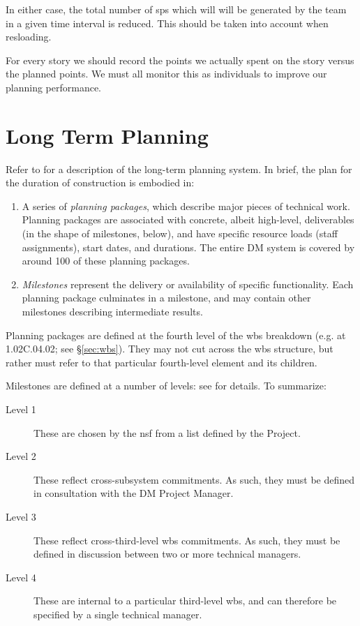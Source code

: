 In either case, the total number of \glspl{sp} which will will be generated by the team in a given time interval is reduced.
This should be taken into account when \gls{resloading}.

For every \gls{story} we should record the points we actually spent on the \gls{story} versus the planned points.
We must all monitor this as individuals to improve our planning performance.

\section{Long Term Planning}
\label{sec:long-term-plan}

Refer to  for a description of the long-term planning system.
In brief, the plan for the duration of construction is embodied in:

\begin{enumerate}
\item
  A series of \emph{planning packages}, which describe major pieces of
  technical work. Planning packages are associated with concrete, albeit
  high-level, deliverables (in the shape of milestones, below), and have
  specific resource loads (staff assignments), start dates, and
  durations. The entire DM system is covered by around 100 of these
  planning packages.
\item
  \emph{Milestones} represent the delivery or availability of specific
  functionality. Each planning package culminates in a milestone, and
  may contain other milestones describing intermediate results.
\end{enumerate}

Planning packages are defined at the fourth level of the \gls{wbs} breakdown (e.g. at 1.02C.04.02; see \S\ref{sec:wbs}).
They may not cut across the \gls{wbs} structure, but rather must refer to that particular fourth-level \gls{element} and its children.

Milestones are defined at a number of levels: see  for details.
To summarize:

\begin{description}
\item[Level 1]
These are chosen by the \gls{nsf} from a list defined by the Project.
\item[Level 2]
These reflect cross-subsystem commitments. As such, they must be defined
in consultation with the DM Project Manager.
\item[Level 3]
These reflect cross-third-level \gls{wbs} commitments. As such, they must be
defined in discussion between two or more technical managers.
\item[Level 4]
These are internal to a particular third-level \gls{wbs}, and can therefore be
specified by a single technical manager.
\end{description}

